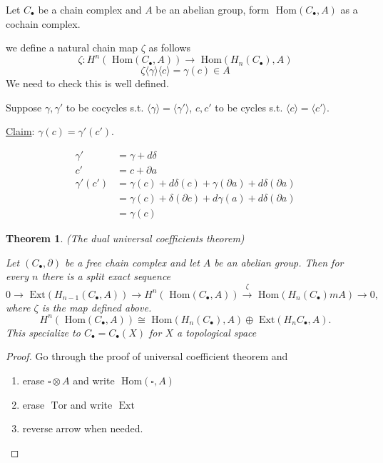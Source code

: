 \documentclass[11pt]{article}
\newtheorem{thm}{Theorem}[section]
\renewcommand{\hom}{\text{ Hom}}
\newcommand{\tor}{\text{ Tor}}
\newcommand{\ext}{\text{ Ext}}
\newcommand{\pd}{\partial}
\newcommand{\lrta}{\longrightarrow}
\newcommand{\lgl}{\langle}
\newcommand{\rgl}{\rangle}
\begin{document}
Let $C_\bullet$ be a chain complex and $A$ be an abelian group, form $\hom(C_\bullet, A)$ as a cochain complex.

we define a natural chain map $\zeta$ as follows
$$\zeta:H^n(\hom(C_\bullet,A))\lrta \hom(H_n(C_\bullet ),A)$$
$$
\zeta\lgl \gamma\rgl\lgl c\rgl =\gamma(c)\in A
$$
We need to check this is well defined.

Suppose $\gamma,\gamma'$ to be cocycles s.t. $\lgl\gamma\rgl=\lgl\gamma'\rgl$, $c,c'$ to be cycles s.t. $\lgl c\rgl=\lgl c'\rgl$.

\underline{Claim}: $\gamma(c)=\gamma'(c')$.

$$
\begin{aligned}
 \gamma'&=\gamma+ d \delta\\
c'&=c+\pd a\\
\gamma'(c')&= \gamma(c)+ d\delta( c)+\gamma(\pd a)+d \delta(\pd a)\\
&= \gamma(c)+ \delta(\pd c)+d\gamma(a)+d \delta(\pd a)\\
&=\gamma(c)
\end{aligned}
$$
\begin{thm}
(The dual universal coefficients theorem)

Let $(C_\bullet,\pd)$ be a free chain complex and let $A$ be an abelian group. Then for every $n$ there is a split exact sequence
$$
0\lrta \ext(H_{n-1}(C_\bullet, A))\lrta H^n(\hom(C_\bullet, A))\overset{\zeta}{\lrta}\hom(H_n(C_\bullet)m A)\lrta 0,
$$
where $\zeta$ is the map defined above.
$$
H^n(\hom(C_\bullet , A))\cong \hom(H_n(C_\bullet), A)\oplus\ext (H_n{C_\bullet}, A). 
$$
This specialize to $C_\bullet=C_\bullet(X)$  for $X$ a topological space
\end{thm}
\begin{proof}
Go through the proof of universal coefficient theorem and 
\begin{enumerate}[label=(\alph*)]
\item erase $\square \otimes A$ and write $\hom(\square, A)$ 
\item erase $\tor $ and write $\ext$
\item reverse arrow when needed.
\end{enumerate}
\end{proof}
\end{document}
